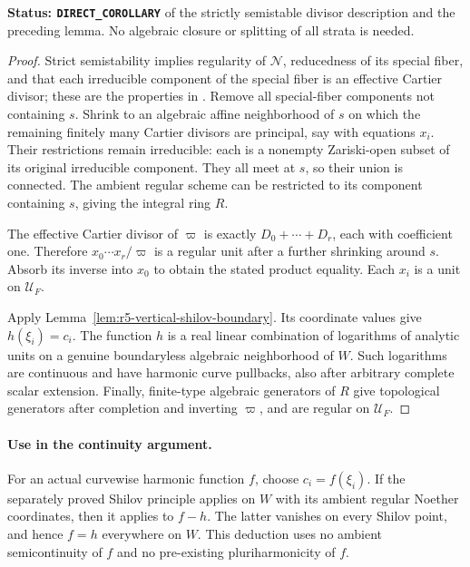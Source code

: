 \documentclass[11pt,a4paper]{article}
\numberwithin{equation}{section}
\theoremstyle{definition}
\theoremstyle{remark}
\begin{document}
\noindent\textbf{Status: \texttt{DIRECT\_COROLLARY}} of the
strictly semistable divisor description and the preceding lemma.
No algebraic closure or splitting of all strata is needed.

\begin{proof}
Strict semistability implies regularity of $\mathcal N$, reducedness
of its special fiber, and that each irreducible component of the
special fiber is an effective Cartier divisor; these are the
properties in \cite[\S2.16]{dJ96}.  Remove all special-fiber
components not containing $s$.  Shrink to an algebraic affine
neighborhood of $s$ on which the remaining finitely many Cartier
divisors are principal, say with equations $x_i$.  Their
restrictions remain irreducible: each is a nonempty Zariski-open
subset of its original irreducible component.  They all meet at
$s$, so their union is connected.  The ambient regular scheme can
be restricted to its component containing $s$, giving the integral
ring $R$.

The effective Cartier divisor of $\varpi$ is exactly
$D_0+\cdots+D_r$, each with coefficient one.  Therefore
$x_0\cdots x_r/\varpi$ is a regular unit after a further shrinking
around $s$.  Absorb its inverse into $x_0$ to obtain the stated
product equality.  Each $x_i$ is a unit on $\mathcal U_F$.

Apply Lemma~\ref{lem:r5-vertical-shilov-boundary}.  Its coordinate
values give $h(\xi_i)=c_i$.  The function $h$ is a real linear
combination of logarithms of analytic units on a genuine
boundaryless algebraic neighborhood of $W$.  Such logarithms are
continuous and have harmonic curve pullbacks, also after arbitrary
complete scalar extension.  Finally, finite-type algebraic
generators of $R$ give topological generators after completion and
inverting $\varpi$, and are regular on $\mathcal U_F$.
\end{proof}

\paragraph{Use in the continuity argument.}
For an actual curvewise harmonic function $f$, choose
$c_i=f(\xi_i)$.  If the separately proved Shilov principle applies
on $W$ with its ambient regular Noether coordinates, then it applies
to $f-h$.  The latter vanishes on every Shilov point, and hence
$f=h$ everywhere on $W$.  This deduction uses no ambient
semicontinuity of $f$ and no pre-existing pluriharmonicity of $f$.

\end{document}
